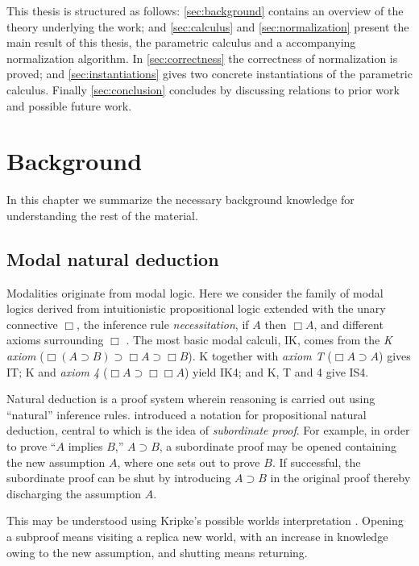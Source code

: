 \documentclass[12pt,twoside,openright]{report}
\numberwithin{equation}{chapter}
\numberwithin{figure}{chapter}
\numberwithin{table}{chapter}
\theoremstyle{definition}\newtheorem{definition}{Definition}
\begin{document}
This thesis is structured as follows:
\autoref{sec:background} contains an overview of the theory underlying the work;
and \autoref{sec:calculus} and \autoref{sec:normalization}
present the main result of this thesis,
the parametric calculus and a accompanying normalization algorithm.
In \autoref{sec:correctness} the correctness of normalization is proved;
and \autoref{sec:instantiations} gives two concrete instantiations
of the parametric calculus.
Finally \autoref{sec:conclusion} concludes by discussing
relations to prior work and possible future work.

\chapter{Background}\label{sec:background}

In this chapter we summarize the necessary background knowledge
for understanding the rest of the material.

\section{Modal natural deduction}

Modalities originate from modal logic.
Here we consider the family of modal logics
derived from intuitionistic propositional logic
extended with the unary connective $\Box$,
the inference rule \emph{necessitation},
if $A$ then $\Box A$,
and different axioms surrounding $\Box$ \cite{clouston18}.
The most basic modal calculi, IK, comes from the \emph{K axiom}
($\Box (A \supset B) \supset \Box A \supset \Box B$).
K together with \emph{axiom T} ($\Box A \supset A$) gives IT;
K and \emph{axiom 4} ($\Box A \supset \Box\Box A$) yield IK4;
and K, T and 4 give IS4.

Natural deduction is a proof system
wherein reasoning is carried out using ``natural'' inference rules.
\textcite{fitch52} introduced a notation for propositional natural deduction,
central to which is the idea of \emph{subordinate proof}.
For example, in order to prove ``$A$ implies $B$,'' $A \supset B$,
a subordinate proof may be opened containing the new assumption $A$,
where one sets out to prove $B$.
If successful, the subordinate proof can be shut
by introducing $A \supset B$ in the original proof
thereby discharging the assumption $A$.

This may be understood using Kripke's possible worlds interpretation \cite{kripke63, huth04}.
Opening a subproof means visiting a replica new world,
with an increase in knowledge owing to the new assumption,
and shutting means returning.
\end{document}
